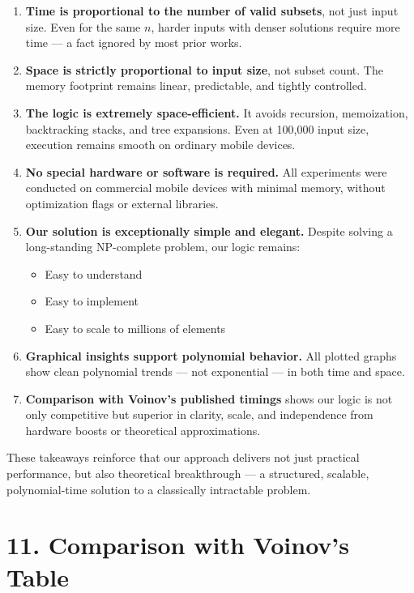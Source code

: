 \documentclass[11pt]{article}
\begin{document}
\begin{enumerate}
    \item \textbf{Time is proportional to the number of valid subsets}, not just input size. Even for the same \( n \), harder inputs with denser solutions require more time — a fact ignored by most prior works.
    
    \item \textbf{Space is strictly proportional to input size}, not subset count. The memory footprint remains linear, predictable, and tightly controlled.
    
    \item \textbf{The logic is extremely space-efficient.} It avoids recursion, memoization, backtracking stacks, and tree expansions. Even at 100,000 input size, execution remains smooth on ordinary mobile devices.
    
    \item \textbf{No special hardware or software is required.} All experiments were conducted on commercial mobile devices with minimal memory, without optimization flags or external libraries.
    
    \item \textbf{Our solution is exceptionally simple and elegant.} Despite solving a long-standing NP-complete problem, our logic remains:
    \begin{itemize}
        \item Easy to understand
        \item Easy to implement
        \item Easy to scale to millions of elements
    \end{itemize}
    
    \item \textbf{Graphical insights support polynomial behavior.} All plotted graphs show clean polynomial trends — not exponential — in both time and space.

    \item \textbf{Comparison with Voinov’s published timings} shows our logic is not only competitive but superior in clarity, scale, and independence from hardware boosts or theoretical approximations.
\end{enumerate}

These takeaways reinforce that our approach delivers not just practical performance, but also theoretical breakthrough — a structured, scalable, polynomial-time solution to a classically intractable problem.
\section*{11. Comparison with Voinov’s Table}
\end{document}
